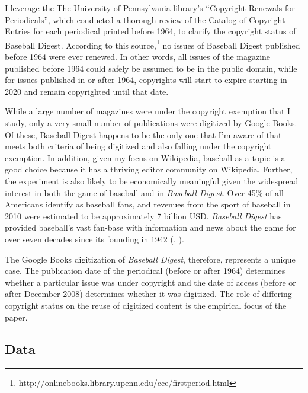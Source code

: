 \documentclass[11pt]{article}
\begin{document}
I leverage the The University of Pennsylvania library's ``Copyright Renewals for Periodicals'', which conducted a thorough review of the  Catalog of Copyright Entries for each periodical printed before 1964, to clarify the copyright status of Baseball Digest. According to this source,\footnote{http://onlinebooks.library.upenn.edu/cce/firstperiod.html} no issues of Baseball Digest published before 1964 were ever renewed. In other words, all issues of the magazine published before 1964 could safely be assumed to be in the public domain, while for issues published in or after 1964, copyrights will start to expire starting in 2020 and remain copyrighted until that date.

While a large number of magazines were under the copyright exemption that I study, only a very small number of publications were digitized by Google Books. Of these, Baseball Digest happens to be the only one that I'm aware of that meets both criteria of being digitized and also falling under the copyright exemption. In addition, given my focus on Wikipedia, baseball as a topic is a good choice because it has a thriving editor community on Wikipedia. Further, the experiment is also likely to be economically meaningful given the widespread interest in both the game of baseball and in \emph{Baseball Digest}. Over 45\% of all Americans identify as baseball fans, and revenues from the sport of baseball in 2010 were estimated to be approximately 7 billion USD. \emph{Baseball Digest} has provided baseball's vast fan-base with information and news about the game for over seven decades since its founding in 1942 (\cite{jones_less_2007}, \cite{brown_mlb_2011}).

The Google Books digitization of \emph{Baseball Digest}, therefore, represents a unique case. The publication date of the periodical (before or after 1964) determines whether a particular issue was under copyright and the date of access (before or after December 2008) determines whether it was digitized. The role of differing copyright status on the reuse of digitized content is the empirical focus of the paper. 

\subsection{Data}
\label{sec:data}
\end{document}
